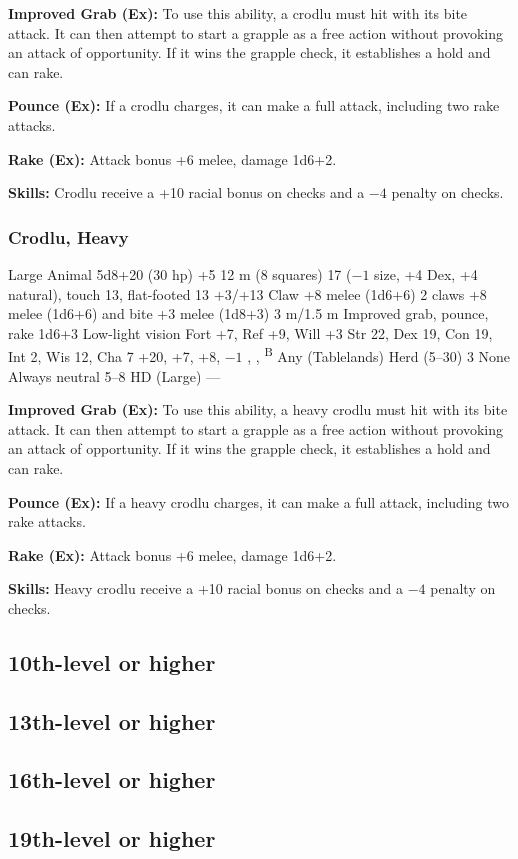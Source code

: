 \textbf{Improved Grab (Ex):} To use this ability, a crodlu must hit with its bite attack. It can then attempt to start a grapple as a free action without provoking an attack of opportunity. If it wins the grapple check, it establishes a hold and can rake.

\textbf{Pounce (Ex):} If a crodlu charges, it can make a full attack, including two rake attacks.

\textbf{Rake (Ex):} Attack bonus +6 melee, damage 1d6+2.

\textbf{Skills:} Crodlu receive a +10 racial bonus on  checks and a $-4$ penalty on  checks.

\subsubsection{Crodlu, Heavy}
\begin{MonsterStats}
{Large Animal}
{5d8+20 (30 hp)}
{+5}
{12 m (8 squares)}
{17 ($-1$ size, +4 Dex, +4 natural), touch 13, flat-footed 13}
{+3/+13}
{Claw +8 melee (1d6+6)}
{2 claws +8 melee (1d6+6) and bite +3 melee (1d8+3)}
{3 m/1.5 m}
{Improved grab, pounce, rake 1d6+3}
{Low-light vision}
{Fort +7, Ref +9, Will +3}
{Str 22, Dex 19, Con 19, Int 2, Wis 12, Cha 7}
{ +20,  +7,  +8,  $-1$}
{, , \textsuperscript{B}}
{Any (Tablelands)}
{Herd (5--30)}
{3}
{None}
{Always neutral}
{5--8 HD (Large)}
{---}
\end{MonsterStats}

\textbf{Improved Grab (Ex):} To use this ability, a heavy crodlu must hit with its bite attack. It can then attempt to start a grapple as a free action without provoking an attack of opportunity. If it wins the grapple check, it establishes a hold and can rake.

\textbf{Pounce (Ex):} If a heavy crodlu charges, it can make a full attack, including two rake attacks.

\textbf{Rake (Ex):} Attack bonus +6 melee, damage 1d6+2.

\textbf{Skills:} Heavy crodlu receive a +10 racial bonus on  checks and a $-4$ penalty on  checks.

\subsection{10th-level or higher}
\subsection{13th-level or higher}
\subsection{16th-level or higher}
\subsection{19th-level or higher}
